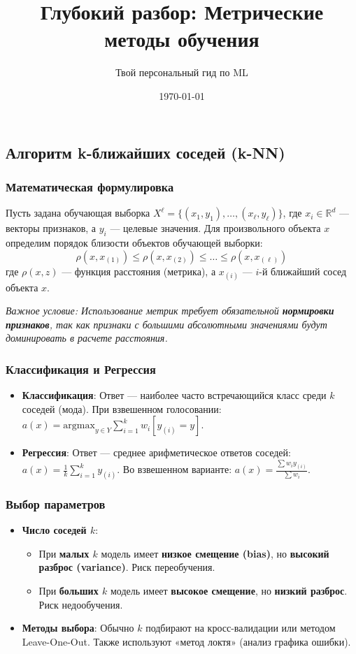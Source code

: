 \documentclass[12pt]{article}
\title{Глубокий разбор: Метрические методы обучения}
\author{Твой персональный гид по ML}
\date{\today}
\newcommand{\commentary}[1]{{\small\itshape\color{commentgray} #1}}
\begin{document}
\subsection{Алгоритм k-ближайших соседей (k-NN)}

\subsubsection{Математическая формулировка}
Пусть задана обучающая выборка $X^\ell = \{(x_1, y_1), \dots, (x_\ell, y_\ell)\}$, где $x_i \in \mathbb{R}^d$ — векторы признаков, а $y_i$ — целевые значения. Для произвольного объекта $x$ определим порядок близости объектов обучающей выборки:
$$\rho(x, x_{(1)}) \le \rho(x, x_{(2)}) \le \dots \le \rho(x, x_{(\ell)})$$
где $\rho(x, z)$ — функция расстояния (метрика), а $x_{(i)}$ — $i$-й ближайший сосед объекта $x$.

\commentary{Важное условие: Использование метрик требует обязательной \textbf{нормировки признаков}, так как признаки с большими абсолютными значениями будут доминировать в расчете расстояния.}

\subsubsection{Классификация и Регрессия}
\begin{itemize}
    \item \textbf{Классификация}: Ответ — наиболее часто встречающийся класс среди $k$ соседей (мода). При взвешенном голосовании:
    $a(x) = \text{argmax}_{y \in Y} \sum_{i=1}^k w_i [y_{(i)} = y]$.
    \item \textbf{Регрессия}: Ответ — среднее арифметическое ответов соседей: $a(x) = \frac{1}{k} \sum_{i=1}^k y_{(i)}$. Во взвешенном варианте: $a(x) = \frac{\sum w_i y_{(i)}}{\sum w_i}$.
\end{itemize}

\subsubsection{Выбор параметров}
\begin{itemize}
    \item \textbf{Число соседей $k$}: 
    \begin{itemize}
        \item При \textbf{малых $k$} модель имеет \textbf{низкое смещение (bias)}, но \textbf{высокий разброс (variance)}. Риск переобучения.
        \item При \textbf{больших $k$} модель имеет \textbf{высокое смещение}, но \textbf{низкий разброс}. Риск недообучения.
    \end{itemize}
    \item \textbf{Методы выбора}: Обычно $k$ подбирают на кросс-валидации или методом Leave-One-Out. Также используют «метод локтя» (анализ графика ошибки).
\end{itemize}
\end{document}
